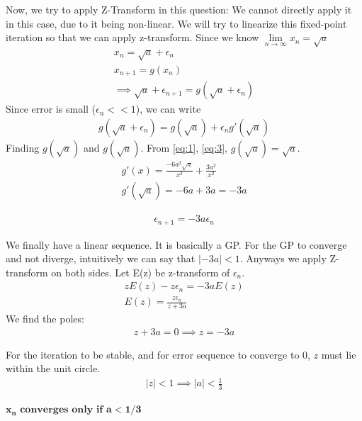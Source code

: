 \documentclass[journal]{IEEEtran}
\begin{document}
Now, we try to apply Z-Transform in this question:
We cannot directly apply it in this case, due to it being non-linear. We will try to linearize this fixed-point iteration so that we can apply z-transform. Since we know  $\lim\limits_{n\to\infty} x_n = \sqrt{a}$
\begin{align}
x_{n} = \sqrt{a} + \epsilon_n \label{eq:2}\\
x_{n+1} = g(x_{n})\\
\implies \sqrt{a} + \epsilon_{n+1} = g(\sqrt{a} + \epsilon_n)
\end{align}
Since error is small ($\epsilon_n << 1$), we can write
\begin{align}
    g(\sqrt{a} + \epsilon_n) = g(\sqrt{a}) + \epsilon_ng'(\sqrt{a})
\end{align}
Finding $g(\sqrt{a})$ and $g(\sqrt{a})$.
From \eqref{eq:1}, \eqref{eq:3}, $g(\sqrt{a}) = \sqrt{a}$.
\begin{align}
    g'(x) = \frac{-6a^2\sqrt{a}}{x^3} + \frac{3a^2}{x^2}\\
    g'(\sqrt{a}) = -6a + 3a = -3a
\end{align}

\begin{align}
    \epsilon_{n+1} = -3a\epsilon_n
\end{align}

We finally have a linear sequence. It is basically a GP. For the GP to converge and not diverge, intuitively we can say that $|-3a| < 1$.
Anyways we apply Z-transform on both sides. Let E(z) be z-transform of $\epsilon_n$.
\begin{align}
    zE(z) - z\epsilon_n = -3aE(z) \\
    E(z) = \frac{z\epsilon_n}{z+3a}
\end{align}
We find the poles:
\begin{align}
    z + 3a = 0 \implies z = -3a
\end{align}

For the iteration to be stable, and for error sequence to converge to 0, $z$ must lie within the unit circle. 
\begin{align}
    |z| < 1 \implies |a| < \frac{1}{3}
\end{align}
\begin{center}
$\boxed{\mathbf{x_n} \textbf{ converges only if } \mathbf{a < 1/3}}$
\end{center}
\end{document}

